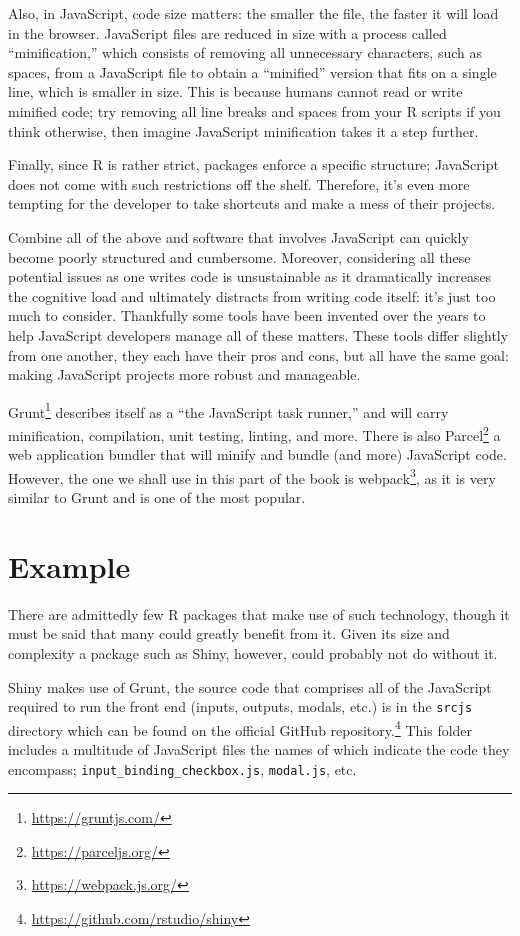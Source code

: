 \documentclass[10pt,]{krantz}
\renewcommand{\href}[2]{#2\footnote{\url{#1}}}
\begin{document}
Also, in JavaScript, code size matters: the smaller the file, the faster it will load in the browser. JavaScript files are reduced in size with a process called ``minification,'' which consists of removing all unnecessary characters, such as spaces, from a JavaScript file to obtain a ``minified'' version that fits on a single line, which is smaller in size. This is because humans cannot read or write minified code; try removing all line breaks and spaces from your R scripts if you think otherwise, then imagine JavaScript minification takes it a step further.

Finally, since R is rather strict, packages enforce a specific structure; JavaScript does not come with such restrictions off the shelf. Therefore, it's even more tempting for the developer to take shortcuts and make a mess of their projects.

Combine all of the above and software that involves JavaScript can quickly become poorly structured and cumbersome. Moreover, considering all these potential issues as one writes code is unsustainable as it dramatically increases the cognitive load and ultimately distracts from writing code itself: it's just too much to consider. Thankfully some tools have been invented over the years to help JavaScript developers manage all of these matters. These tools differ slightly from one another, they each have their pros and cons, but all have the same goal: making JavaScript projects more robust and manageable.

\href{https://gruntjs.com/}{Grunt} describes itself as a ``the JavaScript task runner,'' and will carry minification, compilation, unit testing, linting, and more. There is also \href{https://parceljs.org/}{Parcel} a web application bundler that will minify and bundle (and more) JavaScript code. However, the one we shall use in this part of the book is \href{https://webpack.js.org/}{webpack}, as it is very similar to Grunt and is one of the most popular.

\hypertarget{webpack-example}{%
\section{Example}\label{webpack-example}}

There are admittedly few R packages that make use of such technology, though it must be said that many could greatly benefit from it. Given its size and complexity a package such as Shiny, however, could probably not do without it.

Shiny makes use of Grunt, the source code that comprises all of the JavaScript required to run the front end (inputs, outputs, modals, etc.) is in the \texttt{srcjs} directory which can be found on the \href{https://github.com/rstudio/shiny}{official GitHub repository.} This folder includes a multitude of JavaScript files the names of which indicate the code they encompass; \texttt{input\_binding\_checkbox.js}, \texttt{modal.js}, etc.
\end{document}
